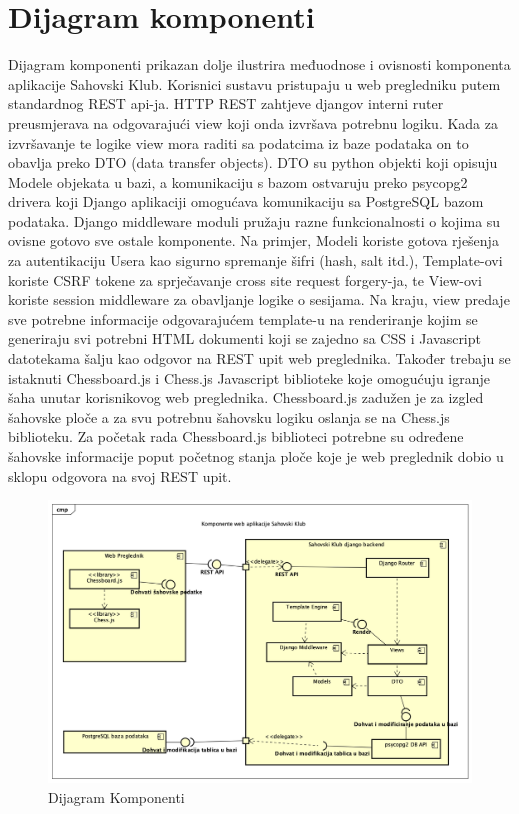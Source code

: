 		\section{Dijagram komponenti}
			Dijagram komponenti prikazan dolje ilustrira međuodnose i ovisnosti komponenta aplikacije Sahovski Klub. Korisnici sustavu pristupaju u web pregledniku putem standardnog REST api-ja. HTTP REST zahtjeve djangov interni ruter preusmjerava na odgovarajući view koji onda izvršava potrebnu logiku. Kada za izvršavanje te logike view mora raditi sa podatcima iz baze podataka on to obavlja preko DTO (data transfer objects). DTO su python objekti koji opisuju Modele objekata u bazi, a komunikaciju s bazom ostvaruju preko psycopg2 drivera koji Django aplikaciji omogućava komunikaciju sa PostgreSQL bazom podataka. Django middleware moduli pružaju razne funkcionalnosti o kojima su ovisne gotovo sve ostale komponente. Na primjer, Modeli koriste gotova rješenja za autentikaciju Usera kao sigurno spremanje šifri (hash, salt itd.), Template-ovi koriste CSRF tokene za sprječavanje cross site request forgery-ja, te View-ovi koriste session middleware za obavljanje logike o sesijama. Na kraju, view predaje sve potrebne informacije odgovarajućem template-u na renderiranje kojim se generiraju svi potrebni HTML dokumenti koji se zajedno sa CSS i Javascript datotekama šalju kao odgovor na REST upit web preglednika. Također trebaju se istaknuti Chessboard.js i Chess.js Javascript biblioteke koje omogućuju igranje šaha unutar korisnikovog web preglednika. Chessboard.js zadužen je za izgled šahovske ploče a za svu potrebnu šahovsku logiku oslanja se na Chess.js biblioteku. Za početak rada Chessboard.js biblioteci potrebne su određene šahovske informacije poput početnog stanja ploče koje je web preglednik dobio u sklopu odgovora na svoj REST upit.
			 
			 \begin{figure}[H]
					\centerfloat
					\advance{}
        					\includegraphics[scale=0.55]{dijagrami/dijagramKomponenti.png} %
        					\caption{Dijagram Komponenti}
        					\label{fig:dijagramKomponenti}
				\end{figure}
